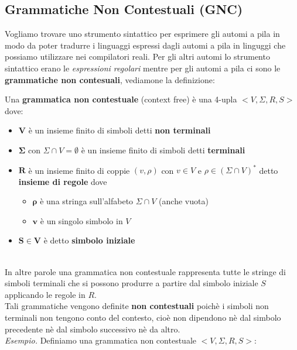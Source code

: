 \subsection{Grammatiche Non Contestuali (GNC)}
Vogliamo trovare uno strumento sintattico per esprimere gli automi a pila in modo da poter tradurre i linguaggi
espressi dagli automi a pila in linguggi che possiamo utilizzare nei compilatori reali. Per gli altri automi lo 
strumento sintattico erano le \textit{espressioni regolari} mentre per gli automi a pila ci sono le \textbf{grammatiche non contesuali},
vediamone la definizione:\smallskip\\
\colorbox{SALZO}{\parbox{\dimexpr\linewidth-2\fboxsep}{\begin{definition}
   Una \textbf{grammatica non contestuale} (context free) è una 4-upla $<V,\Sigma,R,S>$ dove:
   \begin{itemize}
    \item $\bm{V}$ è un insieme finito di simboli detti \textbf{non terminali}
    \item $\bm{\Sigma}$ con $\Sigma \cap V = \emptyset$ è un insieme finito di simboli detti \textbf{terminali}
    \item $\bm{R}$ è un insieme finito di coppie $(v,\rho)$ con $v \in V$ e $\rho \in (\Sigma \cap V)^*$ detto 
    \textbf{insieme di regole} dove
    \begin{itemize}
        \item $\bm{\rho}$ è una stringa sull'alfabeto $\Sigma \cap V$ (anche vuota)
        \item $\bm{v}$ è un singolo simbolo in $V$
    \end{itemize}
    \item $\bm{S \in V}$ è detto \textbf{simbolo iniziale}
   \end{itemize}
\end{definition}}}\smallskip\\
In altre parole una grammatica non contestuale rappresenta tutte le stringe di simboli terminali che si possono produrre a partire dal simbolo
iniziale $S$ applicando le regole in $R$.\\
Tali grammatiche vengono definite \textbf{non contestuali} poichè i simboli non terminali non tengono conto 
del contesto, cioè non dipendono nè dal simbolo precedente nè dal simbolo successivo nè da altro.\smallskip\\
\textit{Esempio.} Definiamo una grammatica non contestuale $<V, \Sigma,R,S>$:
